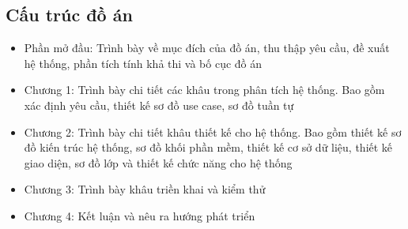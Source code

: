 \subsection*{Cấu trúc đồ án}

\begin{adjustwidth}{1.5em}{}
\begin{itemize}
  \item Phần mở đầu: Trình bày về mục đích của đồ án, thu thập yêu cầu, đề xuất hệ thống, phần tích tính khả thi và bố cục đồ án
  \item Chương 1: Trình bày chi tiết các khâu trong phân tích hệ thống. Bao gồm xác định yêu cầu, thiết kế sơ đồ use case, sơ đồ tuần tự
  \item Chương 2: Trình bày chi tiết khâu thiết kế cho hệ thống. Bao gồm thiết kế sơ đồ kiến trúc hệ thống, sơ đồ khối
  phần mềm, thiết kế cơ sở dữ liệu, thiết kế giao diện, sơ đồ lớp và thiết kế chức năng cho hệ thống
  \item Chương 3: Trình bày khâu triền khai và kiểm thử
  \item Chương 4: Kết luận và nêu ra hướng phát triển
\end{itemize}
\end{adjustwidth}

\cleardoublepage

